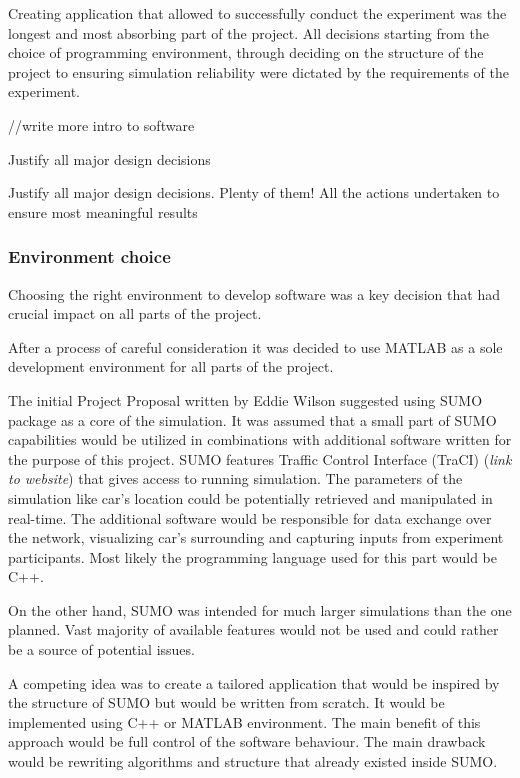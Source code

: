 \documentclass[11pt]{article}
\begin{document}
Creating application that allowed to successfully conduct the experiment was the longest and most absorbing part of the project. All decisions starting from the choice of programming environment, through deciding on the structure of the project to ensuring simulation reliability were dictated by the requirements of the experiment.



//write more intro to software







Justify all major design decisions

Justify all major design decisions. Plenty of them!
All the actions undertaken to ensure most meaningful results


\subsubsection{Environment choice}

Choosing the right environment to develop software was a key decision that had crucial impact on all parts of the project. 

After a process of careful consideration it was decided to use MATLAB as a sole development environment for all parts of the project. 

The initial Project Proposal written by Eddie Wilson suggested using SUMO package as a core of the simulation. It was assumed that a small part of SUMO capabilities would be utilized in combinations with additional software written for the purpose of this project. SUMO features  Traffic Control Interface (TraCI) (\textit{link to website}) that gives access to running simulation. The parameters of the simulation like car's location could be potentially retrieved and manipulated in real-time. The additional software would be responsible for data exchange over the network, visualizing car's surrounding and capturing inputs from experiment participants. Most likely the programming language used for this part would be C++.


On the other hand, SUMO was intended for much larger simulations than the one planned. Vast majority of available features would not be used and could rather be a source of potential issues. 

A competing idea was to create a tailored application that would be inspired by the structure of SUMO but would be written from scratch. It would be implemented using C++ or MATLAB environment. The main benefit of this approach would be full control of the software behaviour. The main drawback would be rewriting algorithms and structure that already existed inside SUMO. 
\end{document}
